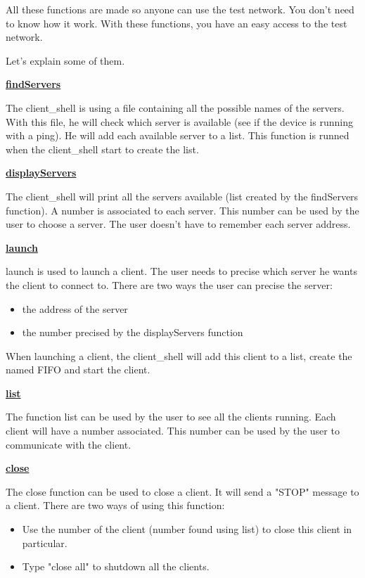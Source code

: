 All these functions are made so anyone can use the test network. You don't need to know how it work. With these functions, you have an easy access to the test network.

Let's explain some of them.

\hfill \break \underline{\large{\textbf{findServers}}}

The client\_shell is using a file containing all the possible names of the servers. With this file, he will check which server is available (see if the device is running with a ping). He will add each available server to a list. This function is runned when the client\_shell start to create the list.


\hfill \break \underline{\large{\textbf{displayServers}}}

The client\_shell will print all the servers available (list created by the findServers function). A number is associated to each server. This number can be used by the user to choose a server. The user doesn't have to remember each server address.

\hfill \break \underline{\large{\textbf{launch}}}

launch is used to launch a client. The user needs to precise which server he wants the client to connect to. There are two ways the user can precise the server:
\begin{itemize}
	\item the address of the server
	\item the number precised by the displayServers function
\end{itemize}
When launching a client, the client\_shell will add this client to a list, create the named FIFO and start the client.

\hfill \break \underline{\large{\textbf{list}}}

The function list can be used by the user to see all the clients running. Each client will have a number associated. This number can be used by the user to communicate with the client.

\hfill \break \underline{\large{\textbf{close}}}

The close function can be used to close a client. It will send a "STOP" message to a client. There are two ways of using this function:
\begin{itemize}
	\item Use the number of the client (number found using list) to close this client in particular.
	\item Type "close all" to shutdown all the clients.
\end{itemize}

